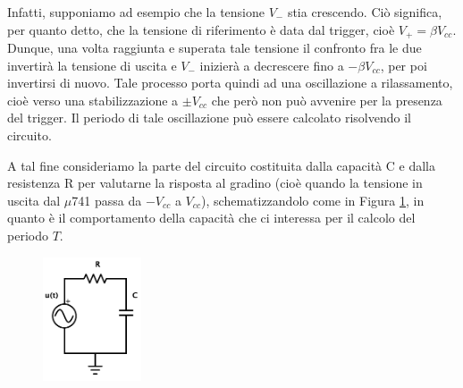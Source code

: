 Infatti, supponiamo ad esempio che la tensione $V_-$ stia crescendo. Ciò significa, per quanto detto, che la tensione di riferimento è data dal trigger, cioè $V_+=\beta V_{cc}$. Dunque, una volta raggiunta e superata tale tensione il confronto fra le due invertirà la tensione di uscita e $V_-$ inizierà a decrescere fino a $-\beta V_{cc}$, per poi invertirsi di nuovo. Tale processo porta quindi ad una oscillazione a rilassamento, cioè verso una stabilizzazione a $\pm V_{cc}$ che però non può avvenire per la presenza del trigger. Il periodo di tale oscillazione può essere calcolato risolvendo il circuito.

A tal fine consideriamo la parte del circuito costituita dalla capacità C e dalla resistenza R per valutarne la risposta al gradino (cioè quando la tensione in uscita dal $\mu$741 passa da $-V_{cc}$ a $V_{cc}$), schematizzandolo come in Figura \ref{cir4:oscillatore_spi}, in quanto è il comportamento della capacità che ci interessa per il calcolo del periodo $T$.

\begin{figure}
  \begin{center}
    \includegraphics[width=0.26\textwidth]{../E04/latex/c_rilassamento_spi.pdf}
  \end{center}
  \caption{}
  \label{cir4:oscillatore_spi}
\end{figure}


